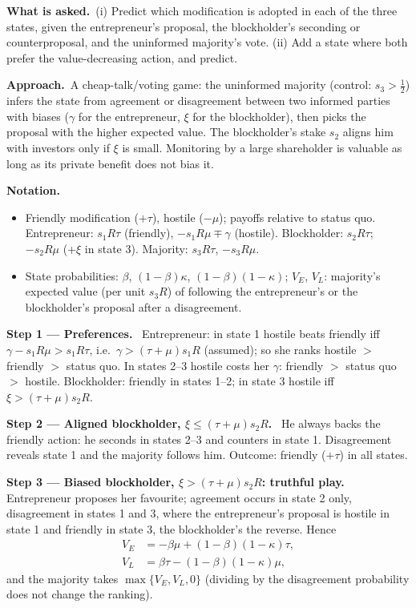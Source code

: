 \documentclass[11pt,a4paper]{article}
\newcommand{\notation}{\par\noindent\textbf{Notation.}}
\newcommand{\step}[2]{\par\medskip\noindent\textbf{Step #1 --- #2.}~}
\newcommand{\asked}{\par\medskip\noindent\textbf{What is asked.}~}
\newcommand{\approach}{\par\smallskip\noindent\textbf{Approach.}~}
\begin{document}
\asked (i) Predict which modification is adopted in each of the three states, given the entrepreneur's proposal, the blockholder's seconding or counterproposal, and the uninformed majority's vote. (ii) Add a state where both prefer the value-decreasing action, and predict.

\approach A cheap-talk/voting game: the uninformed majority (control: $s_3>\tfrac12$) infers the state from agreement or disagreement between two informed parties with biases ($\gamma$ for the entrepreneur, $\xi$ for the blockholder), then picks the proposal with the higher expected value. The blockholder's stake $s_2$ aligns him with investors only if $\xi$ is small. Monitoring by a large shareholder is valuable as long as its private benefit does not bias it.

\notation
\begin{itemize}
  \item Friendly modification ($+\tau$), hostile ($-\mu$); payoffs relative to status quo. Entrepreneur: $s_1R\tau$ (friendly), $-s_1R\mu\mp\gamma$ (hostile). Blockholder: $s_2R\tau$; $-s_2R\mu$ (+$\xi$ in state 3). Majority: $s_3R\tau$, $-s_3R\mu$.
  \item State probabilities: $\beta$, $(1-\beta)\kappa$, $(1-\beta)(1-\kappa)$; $V_E$, $V_L$: majority's expected value (per unit $s_3R$) of following the entrepreneur's or the blockholder's proposal after a disagreement.
\end{itemize}

\step{1}{Preferences} Entrepreneur: in state 1 hostile beats friendly iff $\gamma-s_1R\mu>s_1R\tau$, i.e.\ $\gamma>(\tau+\mu)s_1R$ (assumed); so she ranks hostile $>$ friendly $>$ status quo. In states 2--3 hostile costs her $\gamma$: friendly $>$ status quo $>$ hostile. Blockholder: friendly in states 1--2; in state 3 hostile iff $\xi>(\tau+\mu)s_2R$.

\step{2}{Aligned blockholder, $\xi\le(\tau+\mu)s_2R$} He always backs the friendly action: he seconds in states 2--3 and counters in state 1. Disagreement reveals state 1 and the majority follows him. Outcome: friendly ($+\tau$) in all states.

\step{3}{Biased blockholder, $\xi>(\tau+\mu)s_2R$: truthful play} Entrepreneur proposes her favourite; agreement occurs in state 2 only, disagreement in states 1 and 3, where the entrepreneur's proposal is hostile in state 1 and friendly in state 3, the blockholder's the reverse. Hence
\begin{align}
  V_E &= -\beta\mu+(1-\beta)(1-\kappa)\tau, \label{r8e12-VE}\\
  V_L &= \beta\tau-(1-\beta)(1-\kappa)\mu, \label{r8e12-VL}
\end{align}
and the majority takes $\max\{V_E,V_L,0\}$ (dividing by the disagreement probability does not change the ranking).
\end{document}
